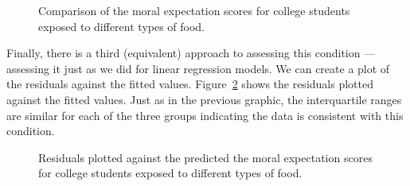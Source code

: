 \documentclass[
  letterpaper,
  DIV=11,
  numbers=noendperiod]{scrreprt}
\theoremstyle{plain}
\theoremstyle{definition}
\theoremstyle{definition}
\theoremstyle{remark}
\begin{document}
\begin{figure}


\caption{\label{fig-anovaassessment-variance-organic-alt}Comparison of
the moral expectation scores for college students exposed to different
types of food.}

\end{figure}%

Finally, there is a third (equivalent) approach to assessing this
condition --- assessing it just as we did for linear regression models.
We can create a plot of the residuals against the fitted values.
Figure~\ref{fig-anovaassessment-variance-organic-alt2} shows the
residuals plotted against the fitted values. Just as in the previous
graphic, the interquartile ranges are similar for each of the three
groups indicating the data is consistent with this condition.

\begin{figure}


\caption{\label{fig-anovaassessment-variance-organic-alt2}Residuals
plotted against the predicted the moral expectation scores for college
students exposed to different types of food.}

\end{figure}%
\end{document}
